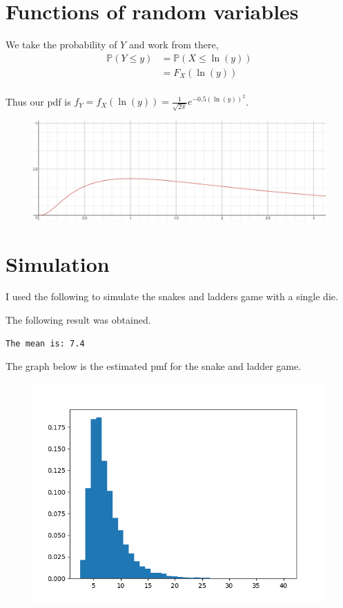 \documentclass{article}
\newcommand{\prob}{\mathbb{P}}
\begin{document}
\section{Functions of random variables}
We take the probability of $Y$ and work from there,
\begin{align*}
    \prob(Y \leq y) &= \prob(X \leq \ln(y)) \\
    &= F_X(\ln(y)) \\
\end{align*}

Thus our pdf is $f_Y = f_X(\ln(y)) = \frac{1}{\sqrt{2\pi}}e^{-0.5(\ln(y))^2}$.
\begin{figure}[H]
    \centering
    \includegraphics[width=5in]{graph.png}
\end{figure}

\section{Simulation}
I used the following to simulate the snakes and ladders game with a single die.


The following result was obtained.
\begin{verbatim}
The mean is: 7.4
\end{verbatim}

The graph below is the estimated pmf for the snake and ladder game.
\begin{figure}[H]
    \centering
    \includegraphics[width=5in]{graph2.png}
\end{figure}
\end{document}
